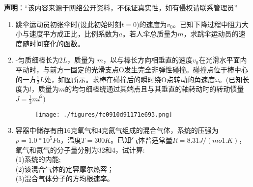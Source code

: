
\textbf{声明}：“该内容来源于网络公开资料，不保证真实性，如有侵权请联系管理员”

\begin{enumerate}
\item 跳伞运动员初张伞时(设此初始时刻$t=0$)的速度为$v_0$。已知下降过程中阻力大小与速度平方成正比，比例系数为$a$。若人伞总质量为$m$，求跳伞运动员的速度随时间变化的函数。
\item -匀质细棒长为$ 2L$，质量为 $m$，以与棒长方向相垂直的速度$v_0$在光滑水平面内平动时，与前方一固定的光滑支点O发生完全非弹性碰撞。碰撞点位于棒中心的一方$\frac{1}{2}L$处，如图所示。求棒在碰撞后的瞬时绕O点转动的角速度$\omega$。(已知长度为$l$，质量为$m$的均匀细棒绕通过其端点且与其垂直的轴转动时的转动惯量$J=\frac{1}{3}ml^2$)
\begin{figure}[ht]
\centering
\texttt{[image: ./figures/fc0910d91171e693.png]}
\caption{} \label{fig_XD11_1}
\end{figure}
\item 容器中储存有由$16$克氧气和$4$克氦气组成的混合气体，系统的压强为$\rho=1.0*10^5Pa$，温度$T=300K$。已知气体普适常量$R=8.31J/(mo1.K)$，氧气和氦气的分子量分别为32和4，试计算:\\
(1)系统的内能;\\
(2)该混合气体的定容摩尔热容；\\
(3)混合气体分子的方均根速率。
\end{enumerate}